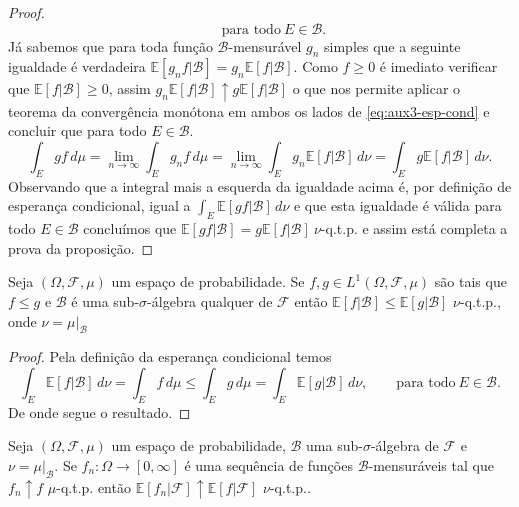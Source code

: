 \begin{proof}
\begin{equation}
\qquad\text{para todo}\ E\in\mathcal{B}.
\end{equation}
Já sabemos que para toda função $\mathcal{B}$-mensurável 
$g_n$ simples que a seguinte igualdade é verdadeira 
$\mathbb{E}[g_nf|\mathcal{B}]=g_n\mathbb{E}[f|\mathcal{B}]$. 
Como $f\geq 0$ é imediato verificar que 
$\mathbb{E}[f|\mathcal{B}]\geq 0$, assim 
$g_n\mathbb{E}[f|\mathcal{B}]\uparrow g\mathbb{E}[f|\mathcal{B}]$ 
o que nos permite aplicar o teorema da convergência monótona em 
ambos os lados de \eqref{eq:aux3-esp-cond} e concluir que 
para todo $E\in\mathcal{B}$.
\[
\int_{E}gf\, d\mu
=
\lim_{n\to\infty}\int_{E}g_nf\, d\mu 
= 
\lim_{n\to\infty}\int_{E} g_n\mathbb{E}[f|\mathcal{B}]\, d\nu
=
\int_{E} g\mathbb{E}[f|\mathcal{B}]\, d\nu.
\]
Observando que a integral mais a esquerda da igualdade acima é, 
por definição de esperança condicional, igual a 
$\int_{E} \mathbb{E}[gf|\mathcal{B}]\, d\nu$ e
que esta igualdade é válida para todo $E\in\mathcal{B}$ 
concluímos que 
$
\mathbb{E}[gf|\mathcal{B}]
=
g\mathbb{E}[f|\mathcal{B}] \ \nu$-q.t.p. 
e assim está completa a prova da proposição.
\end{proof}




\begin{proposicao}
Seja $(\Omega,\mathcal{F},\mu)$ um espaço de probabilidade. 
Se $f,g\in L^1(\Omega,\mathcal{F},\mu)$ são tais que $f\leq g$ e 
$\mathcal{B}$ é uma sub-$\sigma$-álgebra qualquer 
de $\mathcal{F}$ então 
$\mathbb{E}[f|\mathcal{B}]\leq \mathbb{E}[g|\mathcal{B}]$ 
$\nu$-q.t.p., onde $\nu=\mu|_{\mathcal{B}}$
\end{proposicao}

\begin{proof}
Pela definição da esperança condicional temos 
$$
\int_{E} \mathbb{E}[f|\mathcal{B}]\, d\nu= \int_{E} f\, d\mu 
\leq 
\int_{E} g\, d\mu=\int_{E} \mathbb{E}[g|\mathcal{B}]\, d\nu,
\qquad \text{para todo}\ E\in\mathcal{B}.
$$
De onde segue o resultado.
\end{proof}

\begin{teorema}
\label{teo:convergencia-monotona-esp-cond}
Seja $(\Omega,\mathcal{F},\mu)$ um espaço de probabilidade, 
$\mathcal{B}$ uma sub-$\sigma$-álgebra 
de $\mathcal{F}$ e $\nu=\mu|_{\mathcal{B}}$. 
Se $f_n:\Omega\to[0,\infty]$ é uma sequência de funções
$\mathcal{B}$-mensuráveis tal que 
$f_n\uparrow f$ $\mu$-q.t.p. então 
$\mathbb{E}[f_n|\mathcal{F}]\uparrow \mathbb{E}[f|\mathcal{F}]$ 
$\nu$-q.t.p..
\end{teorema}


